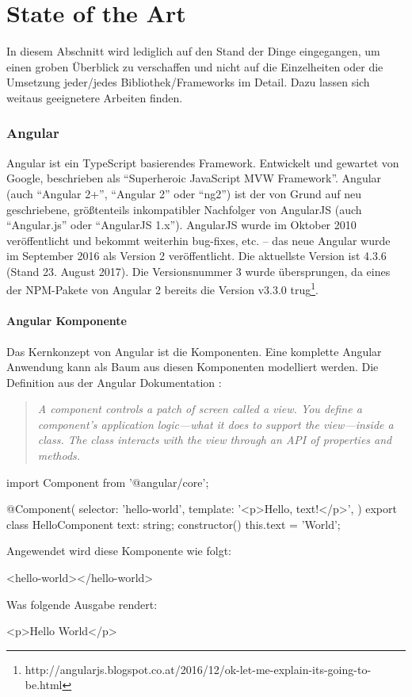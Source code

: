 
\chapter{State of the Art}
\label{cha:StateOfTheArt}
In diesem Abschnitt wird lediglich auf den Stand der Dinge eingegangen, um einen groben Überblick zu verschaffen und nicht auf die Einzelheiten oder die Umsetzung jeder/jedes Bibliothek/Frameworks im Detail. Dazu lassen sich weitaus geeignetere Arbeiten finden.

\subsection{Angular}
Angular ist ein TypeScript basierendes Framework. Entwickelt und gewartet von Google, beschrieben als "`Superheroic JavaScript MVW Framework"'. Angular (auch "`Angular 2+"', "`Angular 2"' oder "`ng2"') ist der von Grund auf neu geschriebene, größtenteils inkompatibler Nachfolger von AngularJS (auch "`Angular.js"' oder "`AngularJS 1.x"').
AngularJS wurde im Oktober 2010 veröffentlicht und bekommt weiterhin bug-fixes, etc. -- das neue Angular wurde im September 2016 als Version 2 veröffentlicht. Die aktuellste Version ist 4.3.6 (Stand 23. August 2017). Die Versionsnummer 3 wurde übersprungen, da eines der NPM-Pakete von Angular 2 bereits die Version v3.3.0 trug\footnote{http://angularjs.blogspot.co.at/2016/12/ok-let-me-explain-its-going-to-be.html}.

\subsubsection{Angular Komponente}
Das Kernkonzept von Angular ist die Komponenten. Eine komplette Angular Anwendung kann als Baum aus diesen Komponenten modelliert werden.
Die Definition aus der Angular Dokumentation \cite{angular-component}: 
\begin{quote}
	\begin{english}
	\textit{A component controls a patch of screen called a view. You define a component's application logic—what it does to support the view—inside a class. The class interacts with the view through an API of properties and methods.}
	\end{english}
\end{quote}

\begin{JsCode}
	import { Component } from '@angular/core';
	
	@Component({
		selector: 'hello-world',
		template: '<p>Hello, {{text}}!</p>',
	})
	export class HelloComponent {
		text: string;
		constructor() {
			this.text = 'World';
		}
	}
\end{JsCode}
Angewendet wird diese Komponente wie folgt:
\begin{JsCode}[numbers=none]
	<hello-world></hello-world>
\end{JsCode}
Was folgende Ausgabe rendert:
\begin{JsCode}Hello World</p>
\end{JsCode}

